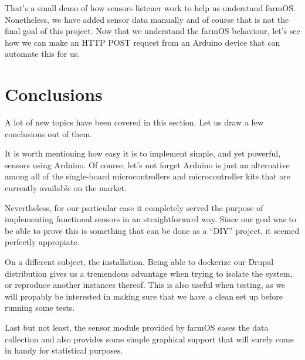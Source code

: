 That's a small demo of how sensors listener work to help us understand farmOS. Nonetheless, we have added sensor data manually and of course that is not the final goal of this project. Now that we understand the farmOS behaviour, let's see how we can make an HTTP POST request from an Arduino device that can automate this for us.

\section{Conclusions}
A lot of new topics have been covered in this section. Let us draw a few conclusions out of them.

It is worth mentioning how easy it is to implement simple, and yet powerful, sensors using Arduino. Of course, let's not forget Arduino is just an alternative among all of the single-board microcontrollers and microcontroller kits that are currently available on the market.

Nevertheless, for our particular case it completely served the purpose of implementing functional sensors in an straightforward way. Since our goal was to be able to prove this is something that can be done as a ``DIY'' project\cite{diy}, it seemed perfectly appropiate.

On a different subject, the installation. Being able to dockerize our Drupal distribution gives us a tremendous advantage when trying to isolate the system, or reproduce another instances thereof. This is also useful when testing, as we will propably be interested in making sure that we have a clean set up before running some tests.

Last but not least, the sensor module provided by farmOS eases the data collection and also provides some simple graphical support that will surely come in handy for statistical purposes.

